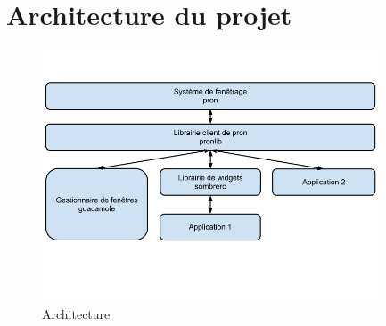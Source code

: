 \section{Architecture du projet}
  
\begin{figure}[H]
  \centering
  \includegraphics[width=10cm]{images/architecture.png}
  \caption{Architecture}
  \label{fig:architecture}
\end{figure}
